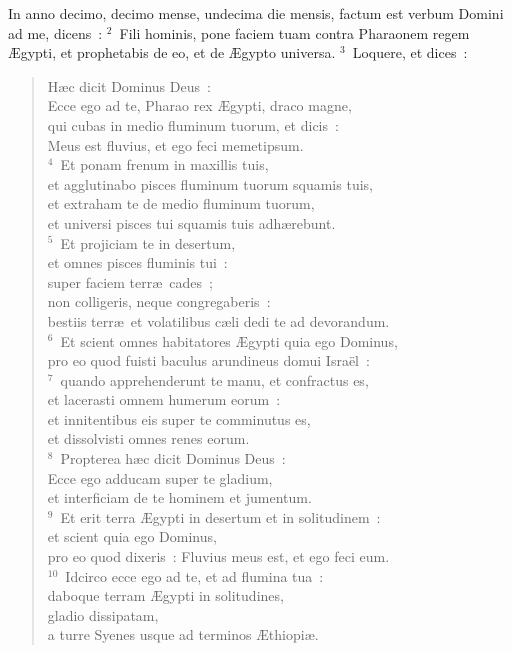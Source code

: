 \bchapter
\lettrine[lines=3,image=true,loversize=0.05,lraise=-0.03]{I}{}n anno decimo, decimo mense, undecima die mensis, factum est verbum Domini ad me, dicens~:
${}^{2}$~Fili hominis, pone faciem tuam contra Pharaonem regem \AE gypti, et prophetabis de eo, et de \AE gypto universa.
${}^{3}$~Loquere, et dices~: \begin{flushleft}\begin{verse}H\ae c dicit Dominus Deus~:\\ Ecce ego ad te, Pharao rex \AE gypti, draco magne,\\ qui cubas in medio fluminum tuorum, et dicis~:\\ Meus est fluvius, et ego feci memetipsum.\\
${}^{4}$~Et ponam frenum in maxillis tuis,\\ et agglutinabo pisces fluminum tuorum squamis tuis,\\ et extraham te de medio fluminum tuorum,\\ et universi pisces tui squamis tuis adh\ae rebunt.\\
${}^{5}$~Et projiciam te in desertum,\\ et omnes pisces fluminis tui~:\\ super faciem terr\ae\ cades~;\\ non colligeris, neque congregaberis~:\\ bestiis terr\ae\ et volatilibus c\ae li dedi te ad devorandum.\\
${}^{6}$~Et scient omnes habitatores \AE gypti quia ego Dominus,\\ pro eo quod fuisti baculus arundineus domui Isra\"el~:\\
${}^{7}$~quando apprehenderunt te manu, et confractus es,\\ et lacerasti omnem humerum eorum~:\\ et innitentibus eis super te comminutus es,\\ et dissolvisti omnes renes eorum.\\
${}^{8}$~Propterea h\ae c dicit Dominus Deus~:\\ Ecce ego adducam super te gladium,\\ et interficiam de te hominem et jumentum.\\
${}^{9}$~Et erit terra \AE gypti in desertum et in solitudinem~:\\ et scient quia ego Dominus,\\ pro eo quod dixeris~: Fluvius meus est, et ego feci eum.\\
${}^{10}$~Idcirco ecce ego ad te, et ad flumina tua~:\\ daboque terram \AE gypti in solitudines,\\ gladio dissipatam,\\ a turre Syenes usque ad terminos \AE thiopi\ae .\\

\end{verse}
\end{flushleft}
